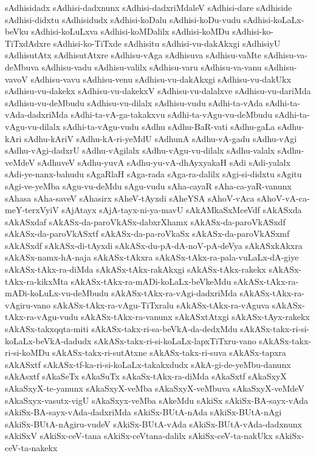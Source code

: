 {sAdhisidadx
sAdhisi-dadxnunx
sAdhisi-dadxriMdaleV
sAdhisi-dare
sAdhiside
sAdhisi-didxtu
sAdhisidudx
sAdhisi-koDalu
sAdhisi-koDu-vudu
sAdhisi-koLaLx-beVku
sAdhisi-koLuLxva
sAdhisi-koMDalilx
sAdhisi-koMDu
sAdhisi-ko-TiTxdAdxre
sAdhisi-ko-TiTxde
sAdhisitu
sAdhisi-vu-dakAkxgi
sAdhisiyU
sAdhisutAtx
sAdhisutAtxre
sAdhisu-vAga
sAdhisuva
sAdhisu-vaMte
sAdhisu-va-deMbuva
sAdhisu-vadu
sAdhisu-valilx
sAdhisu-varu
sAdhisu-va-vanu
sAdhisu-vavoV
sAdhisu-vavu
sAdhisu-venu
sAdhisu-vu-dakAkxgi
sAdhisu-vu-dakUkx
sAdhisu-vu-dakekx
sAdhisu-vu-dakekxV
sAdhisu-vu-dalalxve
sAdhisu-vu-dariMda
sAdhisu-vu-deMbudu
sAdhisu-vu-dilalx
sAdhisu-vudu
sAdhi-ta-vAda
sAdhi-ta-vAda-dadxriMda
sAdhi-ta-vA-ga-takakxvu
sAdhi-ta-vAgu-vu-deMbudu
sAdhi-ta-vAgu-vu-dilalx
sAdhi-ta-vAgu-vudu
sAdhu
sAdhu-BaR-vati
sAdhu-gaLa
sAdhu-kAri
sAdhu-kAriV
sAdhu-kA-ri-yeMdU
sAdhunA
sAdhu-vA-gadu
sAdhu-vAgi
sAdhu-vAgi-dadxrU
sAdhu-vAgilalx
sAdhu-vAgu-vu-dilalx
sAdhu-valalx
sAdhu-veMdeV
sAdhuveV
sAdhu-yuvA
sAdhu-yu-vA-dhAyxyakaH
sAdi
sAdi-yalalx
sAdi-ye-nanx-bahudu
sAgaRlaH
sAga-rada
sAga-ra-dalilx
sAgi-si-didxtu
sAgitu
sAgi-ve-yeMba
sAgu-vu-deMdu
sAgu-vudu
sAha-cayaR
sAha-ca-yaR-vanunx
sAhasa
sAha-saveV
sAhasirx
sAheV-tAyxdi
sAheYSA
sAhoV-vAca
sAhoV-vA-ca-meY-terxVyiV
sAjAtayx
sAjA-tayx-ni-ya-mavU
sAkAMkaSxMceVdf
sAkASxda
sAkASxdaf
sAkASx-da-paroVkASx-dabxrXhamx
sAkASx-da-paroVkASxdf
sAkASx-da-paroVkASxtf
sAkASx-da-pa-roVkaSx
sAkASx-da-paroVkASxmf
sAkASxdf
sAkASx-di-tAyxdi
sAkASx-du-pA-dA-noV-pA-deVya
sAkASxkAkxra
sAkASx-namx-hA-naja
sAkASx-tAkxra
sAkASx-tAkx-ra-pala-vuLaLx-dA-giye
sAkASx-tAkx-ra-diMda
sAkASx-tAkx-rakAkxgi
sAkASx-tAkx-rakekx
sAkASx-tAkx-ra-kikxMta
sAkASx-tAkx-ra-mADi-koLaLx-beVkeMdu
sAkASx-tAkx-ra-mADi-koLuLx-vu-deMbudu
sAkASx-tAkx-ra-vAgi-dadxriMda
sAkASx-tAkx-ra-vAgiru-vano
sAkASx-tAkx-ra-vAgu-TiTxralu
sAkASx-tAkx-ra-vAguva
sAkASx-tAkx-ra-vAgu-vudu
sAkASx-tAkx-ra-vanunx
sAkASxtAtxgi
sAkASx-tAyx-rakekx
sAkASx-takxqqta-miti
sAkASx-takx-ri-sa-beVkA-da-dedxMdu
sAkASx-takx-ri-si-koLaLx-beVkA-dadudx
sAkASx-takx-ri-si-koLaLx-lapxTiTxru-vano
sAkASx-takx-ri-si-koMDu
sAkASx-takx-ri-sutAtxne
sAkASx-takx-ri-suva
sAkASx-tapxra
sAkASxtf
sAkASx-tf-ka-ri-si-koLaLx-takakxdudx
sAkA-gi-de-yeMbu-danunx
sAkAsxtf
sAkaSeTx
sAkaSuTx
sAkaSx-tAkx-ra-diMda
sAkaSxtf
sAkaSxyX
sAkaSxyX-te-yanunx
sAkaSxyX-veMba
sAkaSxyX-veMbuva
sAkaSxyX-veMdeV
sAkaSxyx-vasutx-vigU
sAkaSxyx-veMba
sAkeMdu
sAkiSx
sAkiSx-BA-sayx-vAda
sAkiSx-BA-sayx-vAda-dadxriMda
sAkiSx-BUtA-nAda
sAkiSx-BUtA-nAgi
sAkiSx-BUtA-nAgiru-vudeV
sAkiSx-BUtA-vAda
sAkiSx-BUtA-vAda-dadxnunx
sAkiSxV
sAkiSx-ceV-tana
sAkiSx-ceVtana-dalilx
sAkiSx-ceV-ta-nakUkx
sAkiSx-ceV-ta-nakekx
}
